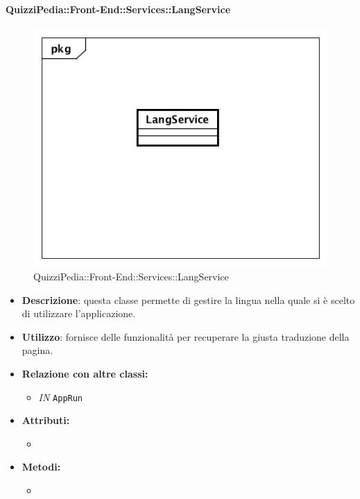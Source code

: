 \paragraph{QuizziPedia::Front-End::Services::LangService}
\begin{figure}
	\centering
	\includegraphics[scale=0.45]{UML/Classi/Front-End/QuizziPedia_Front-end_Services_ LangService.png}
	\caption{QuizziPedia::Front-End::Services::LangService}
\end{figure}
\begin{itemize}
	\item \textbf{Descrizione}: questa classe permette di gestire la lingua nella quale si è scelto di utilizzare l'applicazione.
	\item \textbf{Utilizzo}: fornisce delle funzionalità per recuperare la giusta traduzione della pagina.
	\item \textbf{Relazione con altre classi:}
	\begin{itemize}
		\item \textit{IN} \texttt{AppRun}
	\end{itemize}
	\item \textbf{Attributi:}
	\begin{itemize}
		\item 
	\end{itemize}
	\item \textbf{Metodi:}
	\begin{itemize}
		\item 
	\end{itemize}
\end{itemize}

